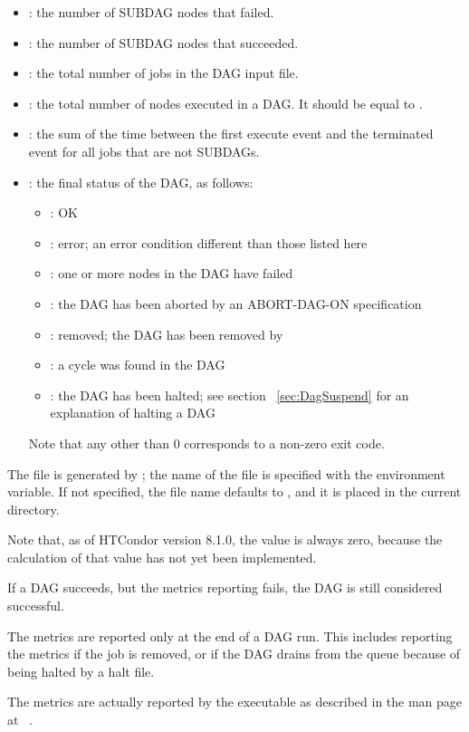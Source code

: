 \begin{itemize}
\item {}: the number of SUBDAG nodes that failed.
\item {}: the number of SUBDAG nodes that succeeded.
\item {}: the total number of jobs in
the DAG input file.
\item {}: the total number of nodes executed in a DAG.
It should be equal to .
\item {}: the sum of the time between the first
execute event and the terminated event for all jobs that are not SUBDAGs.
\item {}: the final status of the DAG, as follows:
  \begin{itemize}
  \item {}: OK
  \item {}: error; an error condition different than those listed here
  \item {}: one or more nodes in the DAG have failed
  \item {}: the DAG has been aborted by an ABORT-DAG-ON specification
  \item {}: removed; the DAG has been removed by 
  \item {}: a cycle was found in the DAG
  \item {}: the DAG has been halted; see section ~\ref{sec:DagSuspend} 
for an explanation of halting a DAG
  \end{itemize}
Note that any  other than 0 corresponds to a non-zero
exit code.
\end{itemize}

The  file is generated by ;
 the name of the  file
is specified with the  environment
variable.
If not specified, the file name defaults to 
, and it is placed in the current directory.

Note that, as of HTCondor version 8.1.0, 
the  value is always zero,
because the calculation of that value has not yet been implemented.

If a DAG succeeds, but the metrics reporting fails, the DAG is
still considered successful.

The metrics are reported only at the end of a DAG run.
This includes reporting the metrics if the  job is removed, 
or if the DAG drains from the queue because of being halted by a halt
file.

The metrics are actually reported by the
 executable
as described in the man page at
~\pageref{man-condor-dagman-metrics-reporter}.

